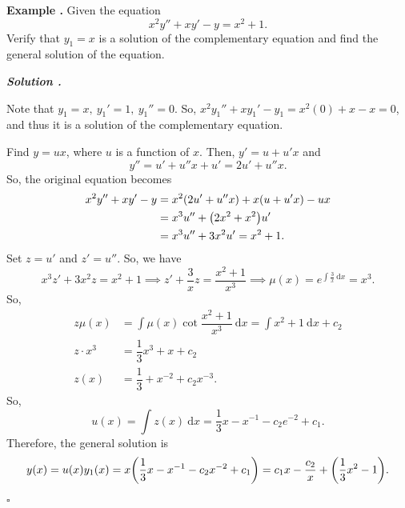 \documentclass[12pt, a4paper]{article}
\newcounter{index}[subsection]
\newenvironment*{eg}{\begin{framed}\par\noindent\textbf{Example \thesubsection.\stepcounter{index}\theindex}}{\par\end{framed}}
\newcounter{nprf}[subsection]
\newenvironment*{sol}{\par\indent\textbf{\textit{Solution \stepcounter{nprf}\thenprf.}}\par}{\hfill{$\square$}\par}
\def\d{{\mathrm{d}}}
\begin{document}
\begin{eg}
	Given the equation \[x^2y''+xy'-y=x^2+1.\] Verify that $y_1=x$ is a solution of the complementary equation and find the general solution of the equation. 
	\begin{sol}
		Note that $y_1=x,\ y_1'=1,\ y_1''=0$. So, $x^2y_1''+xy_1'-y_1=x^2(0)+x-x=0$, and thus it is a solution of the complementary equation.\par Find $y=ux$, where $u$ is a function of $x$. Then, $y'=u+u'x$ and \[y''=u'+u''x+u'=2u'+u''x.\] So, the original equation becomes \begin{align*}x^2y''+xy'-y&=x^2\qty(2u'+u''x)+x\qty(u+u'x)-ux\\&=x^3u''+\qty(2x^2+x^2)u'\\&=x^3u''+3x^2u'=x^2+1.\end{align*} Set $z=u'$ and $z'=u''$. So, we have \[x^3z'+3x^2z=x^2+1\implies z'+\dfrac{3}{x}z=\dfrac{x^2+1}{x^3}\implies\mu(x)=e^{\int\frac{3}{x}\ \d{x}}=x^3.\] So, \begin{align*}z\mu(x)&=\int\mu(x)\cot\dfrac{x^2+1}{x^3}\ \d{x}=\int x^2+1\ \d{x}+c_2\\z\cdot x^3&=\dfrac{1}{3}x^3+x+c_2\\z(x)&=\dfrac{1}{3}+x^{-2}+c_2x^{-3}.\end{align*} So, \[u(x)=\int z(x)\ \d{x}=\dfrac{1}{3}x-x^{-1}-c_2e^{-2}+c_1.\] Therefore, the general solution is \[y(x)=u(x)y_1(x)=x\qty(\dfrac{1}{3}x-x^{-1}-c_2x^{-2}+c_1)=c_1x-\dfrac{c_2}{x}+\qty(\dfrac{1}{3}x^2-1).\]
	\end{sol}
\end{eg}
\end{document}
